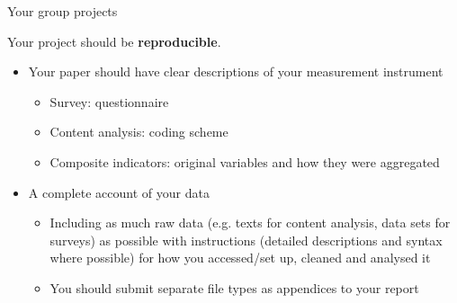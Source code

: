 \documentclass[10pt]{beamer}
\begin{document}
\begin{frame}{Your group projects}

    Your project should be \textbf{reproducible}.

    \begin{itemize}
        \item Your paper should have clear descriptions of your measurement instrument
        \begin{itemize}
            \item Survey: questionnaire
            \item Content analysis: coding scheme
            \item Composite indicators: original variables and how they were aggregated
        \end{itemize}

        \item A complete account of your data
        \begin{itemize}
            \item Including as much raw data (e.g. texts for content analysis, data sets for surveys) as possible with instructions (detailed descriptions and syntax where possible) for how you accessed/set up, cleaned and analysed it
            \item You should submit separate file types as appendices to your report
        \end{itemize}

    \end{itemize}

\end{frame}
\end{document}
